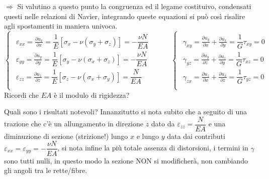 \documentclass{article}
\begin{document}
\begin{adjustwidth}{2in}{}
 \item[$\Rightarrow$] Si valutino a questo punto la congruenza ed il legame costituivo, condensati questi nelle relazioni di Navier, integrando queste equazioni si può così risalire agli spostamenti in maniera univoca.
 	\[ 
 \begin{cases}
 	\begin{aligned}
 		\varepsilon_{xx} =   \frac{\partial u_x}{\partial x} = \dfrac{1}{E}[\sigma_x - \nu(\sigma_y + \sigma_z)] = -\dfrac{\nu N}{EA} \\
 		\varepsilon_{yy} =   \frac{\partial u_y}{\partial y} = \dfrac{1}{E}[\sigma_y - \nu(\sigma_x + \sigma_z)] = -\dfrac{\nu N}{EA} \\
 		\varepsilon_{zz} =   \frac{\partial u_z}{\partial z} = \dfrac{1}{E}[\sigma_z - \nu(\sigma_x + \sigma_y)] = \dfrac{ N}{EA} \\
 	\end{aligned}
 \end{cases} \hspace{1cm} \begin{cases}
 	\begin{aligned}
 		\gamma_{xy} =   \frac{\partial u_y}{\partial x} + \frac{\partial u_x}{\partial y} = \dfrac{1}{G} \tau_{xy} = 0\\
 		\gamma_{yz} =   \frac{\partial u_y}{\partial z} + \frac{\partial u_z}{\partial y} = \dfrac{1}{G} \tau_{xz} = 0 \\
 		\gamma_{zx} =   \frac{\partial u_z}{\partial x} + \frac{\partial u_x}{\partial z} = \dfrac{1}{G} \tau_{yz} = 0 \\
 	\end{aligned}
 \end{cases}
 \]
 	Ricordi che $EA$ è il modulo di rigidezza? \newline 
 	
 	 Quali sono i risultati notevoli? Innanzitutto si nota subito che a seguito di una trazione che c'è un allungamento in direzione $z$ dato da $\varepsilon_{zz} = \dfrac{ N}{EA}$ e una diminuzione di sezione (strizione!) lungo $ x $ e lungo $ y $ data dai contributi $\varepsilon_{xx} = \varepsilon_{yy} = -\dfrac{\nu N}{EA}$, si nota infine  la più totale assenza di distorsioni, i termini in $\gamma$ sono tutti nulli, in questo modo la sezione NON si modificherà, non cambiando gli angoli tra le rette/fibre. 
 	

\end{adjustwidth}
\end{document}
